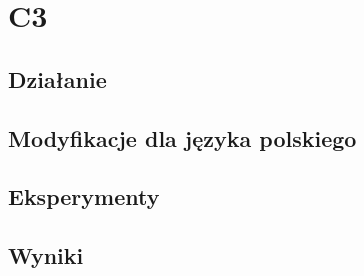 \section{C3}

\subsection{Działanie}

\subsection{Modyfikacje dla języka polskiego}

\subsection{Eksperymenty}

\subsection{Wyniki}

